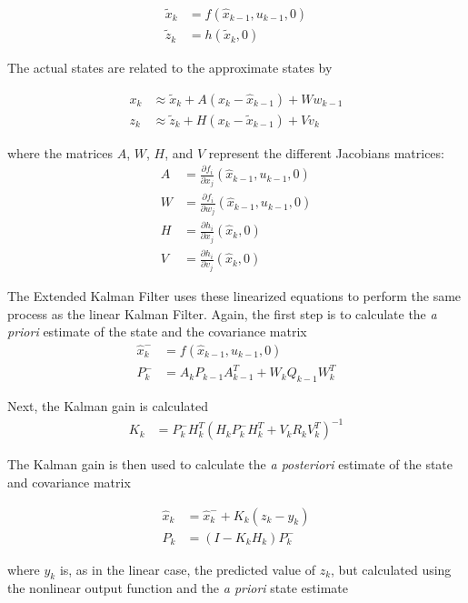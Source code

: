 \documentclass[]{aiaa-tc}%
\begin{document}
\begin{align}
\tilde{x}_k &= f(\hat{x}_{k-1},u_{k-1},0)\\
\tilde{z}_k &= h(\tilde{x}_k,0)
\end{align}

The actual states are related to the approximate states by

\begin{align}
x_k &\approx\tilde{x}_k+A(x_k-\hat{x}_{k-1})+Ww_{k-1}\\
z_k &\approx\tilde{z}_k+H(x_k-\tilde{x}_{k-1})+Vv_k
\end{align}

where  the matrices $A$, $W$, $H$, and $V$ represent the different Jacobians matrices:
\begin{align}
A &= \frac{\partial f_i}{\partial x_j}(\hat{x}_{k-1},u_{k-1},0)\\
W &= \frac{\partial f_i}{\partial w_j}(\hat{x}_{k-1},u_{k-1},0)\\
H &= \frac{\partial h_i}{\partial x_j}(\hat{x}_{k},0)\\
V &= \frac{\partial h_i}{\partial v_j}(\hat{x}_{k},0)
\end{align}

The Extended Kalman Filter uses these linearized equations to perform the same process as the linear Kalman Filter. Again, the first step is to calculate the \textit{a priori} estimate of the state and the covariance matrix
\begin{align}
\hat{x}^-_k &=f(\hat{x}_{k-1},u_{k-1},0)\\
P^-_k  &= A_kP_{k-1}A^T_{k-1}+W_kQ_{k-1}W^T_k
\end{align}

Next, the Kalman gain is calculated
\begin{align}
K_k &=P^-_kH^T_k(H_kP^-_kH^T_k+V_kR_kV^T_k)^{-1}
\end{align}

The Kalman gain is then used to calculate the \textit{a posteriori} estimate of the state and covariance matrix

\begin{align}
\hat{x}_k &=\hat{x}^-_{k}+K_k(z_k-y_k)\\
\label{kalmanVariance}
P_k &=(I-K_kH_k)P^-_k
\end{align}

where $y_k$ is, as in the linear case, the predicted value of $z_k$, but calculated using the nonlinear output function and the \textit{a priori} state estimate
\end{document}
